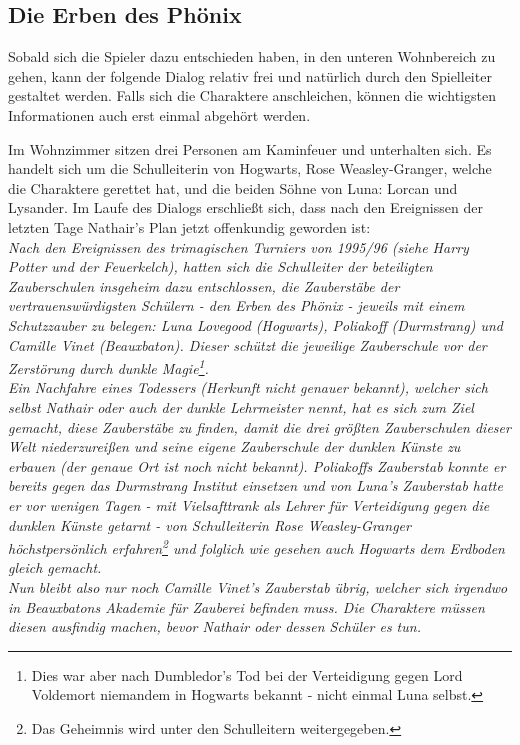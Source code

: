\documentclass[]{scrartcl}
\begin{document}
\subsection{Die Erben des Phönix}


Sobald sich die Spieler dazu entschieden haben, in den unteren Wohnbereich zu gehen, kann der folgende Dialog relativ frei und natürlich durch den Spielleiter gestaltet werden. Falls sich die Charaktere anschleichen, können die wichtigsten Informationen auch erst einmal abgehört werden.

Im Wohnzimmer sitzen drei Personen am Kaminfeuer und unterhalten sich. Es handelt sich um die Schulleiterin von Hogwarts, Rose Weasley-Granger, welche die Charaktere gerettet hat, und die beiden Söhne von Luna: Lorcan und Lysander. Im Laufe des Dialogs erschließt sich, dass nach den Ereignissen der letzten Tage Nathair's Plan jetzt offenkundig geworden ist:\\

\textit{Nach den Ereignissen des trimagischen Turniers von 1995/96 (siehe Harry Potter und der Feuerkelch), hatten sich die Schulleiter der beteiligten Zauberschulen insgeheim dazu entschlossen, die Zauberstäbe der vertrauenswürdigsten Schülern - den Erben des Phönix - jeweils mit einem Schutzzauber zu belegen: Luna Lovegood (Hogwarts), Poliakoff (Durmstrang) und Camille Vinet (Beauxbaton). Dieser schützt die jeweilige Zauberschule vor der Zerstörung durch dunkle Magie\footnote{Dies war aber nach Dumbledor's Tod bei der Verteidigung gegen Lord Voldemort niemandem in Hogwarts bekannt - nicht einmal Luna selbst.}.\\
Ein Nachfahre eines Todessers (Herkunft nicht genauer bekannt), welcher sich selbst Nathair oder auch der dunkle Lehrmeister nennt, hat es sich zum Ziel gemacht, diese Zauberstäbe zu finden, damit die drei größten Zauberschulen dieser Welt niederzureißen und seine eigene Zauberschule der dunklen Künste zu erbauen (der genaue Ort ist noch nicht bekannt). Poliakoffs Zauberstab konnte er bereits gegen das Durmstrang Institut einsetzen und von Luna's Zauberstab hatte er vor wenigen Tagen - mit Vielsafttrank als Lehrer für Verteidigung gegen die dunklen Künste getarnt - von Schulleiterin Rose Weasley-Granger höchstpersönlich erfahren\footnote{Das Geheimnis wird unter den Schulleitern weitergegeben.} und folglich wie gesehen auch Hogwarts dem Erdboden gleich gemacht.\\
Nun bleibt also nur noch Camille Vinet's Zauberstab übrig, welcher sich irgendwo in Beauxbatons Akademie für Zauberei befinden muss. Die Charaktere müssen diesen ausfindig machen, bevor Nathair oder dessen Schüler es tun.}\\
\end{document}
